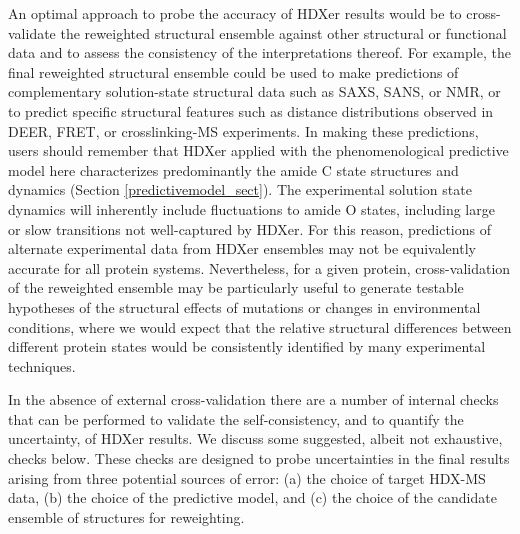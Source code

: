 \documentclass[9pt,tutorial,ASAPversion]{livecoms}
\begin{document}
An optimal approach to probe the accuracy of HDXer results would be to cross-validate the reweighted structural ensemble against other structural or functional data and to assess the consistency of the interpretations thereof.
For example, the final reweighted structural ensemble could be used to make predictions of complementary solution-state structural data such as SAXS, SANS, or NMR, or to predict specific structural features such as distance distributions observed in DEER, FRET, or crosslinking-MS experiments.
In making these predictions, users should remember that HDXer applied with the phenomenological predictive model here \cite{BestVendruscolo2006} characterizes predominantly the amide C state structures and dynamics (Section \ref{predictivemodel_sect}).
The experimental solution state dynamics will inherently include fluctuations to amide O states, including large or slow transitions not well-captured by HDXer.
For this reason, predictions of alternate experimental data from HDXer ensembles may not be equivalently accurate for all protein systems. 
Nevertheless, for a given protein, cross-validation of the reweighted ensemble may be particularly useful to generate testable hypotheses of the structural effects of mutations or changes in environmental conditions, where we would expect that the relative structural differences between different protein states would be consistently identified by many experimental techniques.

In the absence of external cross-validation there are a number of internal checks that can be performed to validate the self-consistency, and to quantify the uncertainty, of HDXer results.
We discuss some suggested, albeit not exhaustive, checks below.
These checks are designed to probe uncertainties in the final results arising from three potential sources of error: (a) the choice of target HDX-MS data, (b) the choice of the predictive model, and (c) the choice of the candidate ensemble of structures for reweighting.
\end{document}
